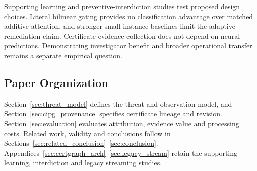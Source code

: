 Supporting learning and preventive-interdiction studies test proposed design choices. Literal bilinear gating provides no classification advantage over matched additive attention, and stronger small-instance baselines limit the adaptive remediation claim. Certificate evidence collection does not depend on neural predictions. Demonstrating investigator benefit and broader operational transfer remains a separate empirical question.

\subsection{Paper Organization}
Section~\ref{sec:threat_model} defines the threat and observation model, and Section~\ref{sec:cipg_provenance} specifies certificate lineage and revision. Section~\ref{sec:evaluation} evaluates attribution, evidence value and processing costs. Related work, validity and conclusions follow in Sections~\ref{sec:related_conclusion}--\ref{sec:conclusion}. Appendices~\ref{sec:certgraph_arch}--\ref{sec:legacy_stream} retain the supporting learning, interdiction and legacy streaming studies.
